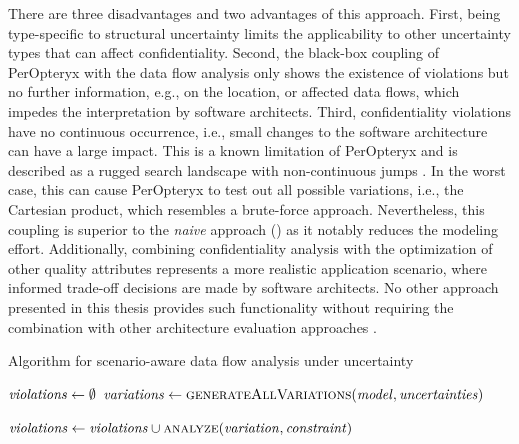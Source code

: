 There are three disadvantages and two advantages of this approach.
First, being type-specific to structural uncertainty limits the applicability to other uncertainty types that can affect confidentiality.
Second, the black-box coupling of PerOpteryx with the data flow analysis only shows the existence of violations but no further information, e.g., on the location, or affected data flows, which impedes the interpretation by software architects.
Third, confidentiality violations have no continuous occurrence, i.e., small changes to the software architecture can have a large impact.
This is a known limitation of PerOpteryx and is described as a rugged search landscape with non-continuous jumps \cite{koziolek_automated_2011}.
In the worst case, this can cause PerOpteryx to test out all possible variations, i.e., the Cartesian product, which resembles a brute-force approach.
Nevertheless, this coupling is superior to the \emph{naive} approach () as it notably reduces the modeling effort.
Additionally, combining confidentiality analysis with the optimization of other quality attributes represents a more realistic application scenario, where informed trade-off decisions are made by software architects.
No other approach presented in this thesis provides such functionality without requiring the combination with other architecture evaluation approaches \cite{sobhy_evaluation_2021}.


\begin{algorithm}
    \caption{Algorithm for scenario-aware data flow analysis under uncertainty}
    \label{alg:confidentialityanalysis:scenarioaware}
    \begin{algorithmic}[1]
            \algindentskip
            \State $\mathit{violations} \gets \emptyset$
            \State $\mathit{variations} \gets \textsc{generateAllVariations}(\mathit{model}, \mathit{uncertainties})$
            \algblockskip

             
                \State $\mathit{violations} \gets \mathit{violations} \cup \textsc{analyze}(\mathit{variation}, \mathit{constraint})$ 
            \EndFor
            \algblockskip

            \State {}
            \algindentskip
        \EndProcedure   
    \end{algorithmic}
\end{algorithm}

